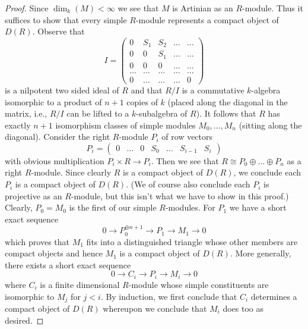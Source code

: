\documentclass{stacks-project}
\theoremstyle{plain}
\theoremstyle{definition}
\theoremstyle{remark}
\numberwithin{equation}{subsection}
\begin{document}
\begin{proof}
\medskip\noindent
Since $\dim_k(M) < \infty$ we see that $M$ is Artinian as an $R$-module.
Thus it suffices to show that every simple $R$-module represents a
compact object of $D(R)$. Observe that
$$
I =
\left(
\begin{matrix}
0 & S_1 & S_2 & \ldots & \ldots \\
0 & 0 & S_1 & \ldots & \ldots\\
0 & 0 & 0 & \ldots & \ldots \\
\ldots & \ldots & \ldots & \ldots & \ldots \\
0 & \ldots & \ldots & \ldots & 0
\end{matrix}
\right)
$$
is a nilpotent two sided ideal of $R$ and that $R/I$
is a commutative $k$-algebra isomorphic to a product of $n + 1$ copies of
$k$ (placed along the diagonal in the matrix, i.e., $R/I$ can be lifted
to a $k$-subalgebra of $R$). It follows that $R$ has exactly $n + 1$
isomorphism classes of simple modules $M_0, \ldots, M_n$ (sitting along
the diagonal). Consider the right $R$-module $P_i$ of row vectors
$$
P_i =
\left(
\begin{matrix}
0 &
\ldots &
0 &
S_0 &
\ldots &
S_{i - 1} &
S_i
\end{matrix}
\right)
$$
with obvious multiplication $P_i \times R \to P_i$. Then we see that
$R \cong P_0 \oplus \ldots \oplus P_n$ as a right $R$-module. Since clearly
$R$ is a compact object of $D(R)$, we conclude each $P_i$ is a compact
object of $D(R)$. (We of course also conclude each $P_i$ is projective
as an $R$-module, but this isn't what we have to show in this proof.)
Clearly, $P_0 = M_0$ is the first of our simple $R$-modules.
For $P_1$ we have a short exact sequence
$$
0 \to P_0^{\oplus n + 1} \to P_1 \to M_1 \to 0
$$
which proves that $M_1$ fits into a distinguished triangle whose
other members are compact objects and hence $M_1$ is a compact
object of $D(R)$. More generally, there exists a short exact sequence
$$
0 \to C_i \to P_i \to M_i \to 0
$$
where $C_i$ is a finite dimensional $R$-module whose simple constituents
are isomorphic to $M_j$ for $j < i$. By induction, we first conclude that
$C_i$ determines a compact object of $D(R)$ whereupon we conclude that $M_i$
does too as desired.
\end{proof}
\end{document}
